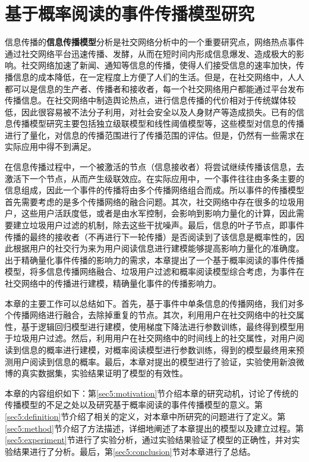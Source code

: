 \chapter{基于概率阅读的事件传播模型研究}
\label{chap5:main}
信息传播的\textbf{信息传播模型}分析是社交网络分析中的一个重要研究点，网络热点事件通过社交网络平台迅速传播、发酵，从而在短时间内形成信息爆发、造成极大的影响。社交网络加速了新闻、通知等信息的传播，使得人们接受信息的速率加快，传播信息的成本降低，在一定程度上方便了人们的生活。但是，在社交网络中，人人都可以是信息的生产者、传播者和接收者，每一个社交网络用户都能通过平台发布传播信息。在社交网络中制造舆论热点，进行信息传播的代价相对于传统媒体较低，因此很容易被不法分子利用，对社会安全以及人身财产等造成损失。已有的信息传播模型研究主要包括独立级联模型和线性阈值模型等，这些模型对信息的传播进行了量化，对信息的传播范围进行了传播范围的评估。但是，仍然有一些需求在实际应用中得不到满足。

在信息传播过程中，一个被激活的节点（信息接收者）将尝试继续传播该信息，去激活下一个节点，从而产生级联效应。在实际应用中，一个事件往往由多条主要的信息组成，因此一个事件的传播将由多个传播网络组合而成。所以事件的传播模型首先需要考虑的是多个传播网络的融合问题。其次，社交网络中存在很多的垃圾用户，这些用户活跃度低，或者是由水军控制，会影响到影响力量化的计算，因此需要建立垃圾用户过滤的机制，除去这些干扰噪声。最后，信息的叶子节点，即事件传播的最终的接收者（不再进行下一轮传播）是否阅读到了该信息是概率性的，因此根据用户的社交行为来为用户阅读信息进行建模能够提高影响力量化的准确度。出于精确量化事件传播的影响力的需求，本章提出了一个基于概率阅读的事件传播模型，将多信息传播网络融合、垃圾用户过滤和概率阅读模型综合考虑，为事件在社交网络中的传播进行建模，精确量化事件的传播影响力。

本章的主要工作可以总结如下。首先，基于事件中单条信息的传播网络，我们对多个传播网络进行融合，去除掉重复的节点。其次，利用用户在社交网络中的社交属性，基于逻辑回归模型进行建模，使用梯度下降法进行参数训练，最终得到模型用于垃圾用户过滤。然后，利用用户在社交网络中的时间线上的社交属性，对用户阅读到信息的概率进行建模，对概率阅读模型进行参数训练，得到的模型最终用来预测用户阅读到信息的概率。最后，本章对提出的模型进行了验证，实验使用新浪微博的真实数据集，实验结果证明了模型的有效性。

本章的内容组织如下：第\ref{sec5:motivation}节介绍本章的研究动机，讨论了传统的传播模型的不足之处以及研究基于概率阅读的事件传播模型的意义。第\ref{sec5:definition}节介绍了相关的定义，对本章中所研究的问题进行了定义。第\ref{sec5:method}节介绍了方法描述，详细地阐述了本章提出的模型以及建立过程。第\ref{sec5:experiment}节进行了实验分析，通过实验结果验证了模型的正确性，并对实验结果进行了分析。最后，第\ref{sec5:conclusion}节对本章进行了总结。
